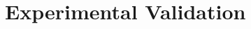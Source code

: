 \documentclass{IPEC2026}
\begin{document}

\section{Experimental Validation}
 







\end{document}
